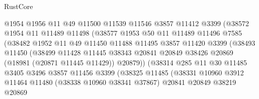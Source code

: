 \begin{lexlean}{RustCore}
\begin{coremodule}
                          @1954
                          @1956
                          @11
                          @49
                          @11500
                          @11539
                          @11546
                          @3857
                          @11412
                          @3399
                          (@38572
                            @1954
                            @11
                            @11489
                            @11498
                            (@38577
                              @1953
                              @50
                              @11
                              @11489
                              @11496
                              @7585
                              (@38482
                                @1952
                                @11
                                @49
                                @11450
                                @11488
                                @11495
                                @3857
                                @11420
                                @3399
                                (@38493
                                  @11450
                                  (@38499
                                    @11428
                                    @11445
                                    @38343
                                    @20841
                                    @20849
                                    @38426
                                    @20869
                                    (@18981 (@20871 @11445 @11429))
                                    @20879))
                                (@38314
                                  @285
                                  @11
                                  @30
                                  @11485
                                  @3405
                                  @3496
                                  @3857
                                  @11456
                                  @3399
                                  (@38325
                                    @11485
                                    (@38331
                                      @10960
                                      @3912
                                      @11464
                                      @11480
                                      (@38338 @10960 @38341 @37867)
                                      @20841
                                      @20849
                                      @38219
                                      @20869

\end{coremodule}
\end{lexlean}
